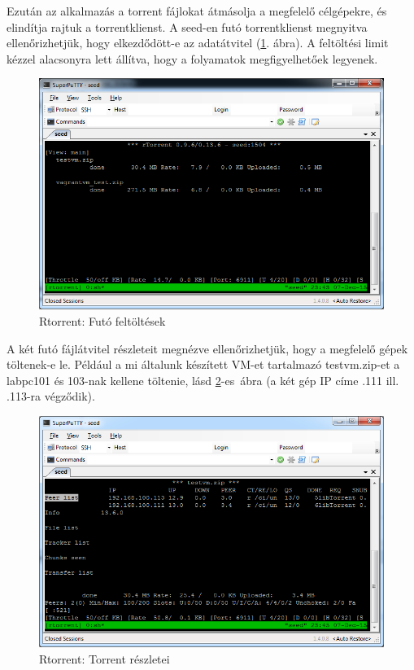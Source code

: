 Ezután az alkalmazás a torrent fájlokat átmásolja a megfelelő célgépekre, és elindítja rajtuk a torrentklienst. A seed-en futó torrentklienst megnyitva ellenőrizhetjük, hogy elkezdődött-e az adatátvitel (\ref{fig:seed_torrent}. ábra). A feltöltési limit kézzel alacsonyra lett állítva, hogy a folyamatok megfigyelhetőek legyenek.

\begin{figure}[ht]
\centering
\includegraphics[width=120mm, keepaspectratio]{figures/test_seed_torrent.png}
\caption{Rtorrent: Futó feltöltések}
\label{fig:seed_torrent}
\end{figure}

A két futó fájlátvitel részleteit megnézve ellenőrizhetjük, hogy a megfelelő gépek töltenek-e le. Például a mi általunk készített VM-et tartalmazó testvm.zip-et a labpc101 és 103-nak kellene töltenie, lásd \ref{fig:seed_peers}-es~ábra (a két gép IP címe .111 ill. .113-ra végződik).

\begin{figure}[ht]
\centering
\includegraphics[width=120mm, keepaspectratio]{figures/test_seed_peers.png}
\caption{Rtorrent: Torrent részletei}
\label{fig:seed_peers}
\end{figure}

